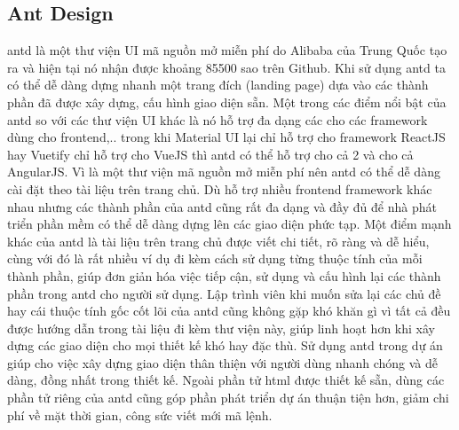 \documentclass[./../main.tex]{subfiles}
\begin{document}
\subsection{Ant Design}
\acrfull{antd} \cite{antdesign} là một thư viện UI mã nguồn mở miễn phí do Alibaba của Trung Quốc tạo ra và hiện tại nó nhận được khoảng 85500 sao trên Github. Khi sử dụng \acrshort{antd} ta có thể dễ dàng dựng nhanh một trang đích (landing page) dựa vào các thành phần đã được xây dựng, cấu hình giao diện sẵn. Một trong các điểm nổi bật của \acrshort{antd} so với các thư viện UI khác là nó hỗ trợ đa dạng các cho các framework dùng cho frontend,.. trong khi Material UI lại chỉ hỗ trợ cho framework ReactJS hay Vuetify chỉ hỗ trợ cho VueJS thì \acrshort{antd} có thể hỗ trợ cho cả 2 và cho cả AngularJS. Vì là một thư viện mã nguồn mở miễn phí nên \acrshort{antd} có thể dễ dàng cài đặt theo tài liệu trên trang chủ. Dù hỗ trợ nhiều frontend framework khác nhau nhưng các thành phần của \acrshort{antd} cũng rất đa dạng và đầy đủ để nhà phát triển phần mềm có thể dễ dàng dựng lên các giao diện phức tạp. Một điểm mạnh khác của \acrshort{antd} là tài liệu trên trang chủ được viết chi tiết, rõ ràng và dễ hiểu, cùng với đó là rất nhiều ví dụ đi kèm cách sử dụng từng thuộc tính của mỗi thành phần, giúp đơn giản hóa việc tiếp cận, sử dụng và cấu hình lại các thành phần trong \acrshort{antd} cho người sử dụng. Lập trình viên khi muốn sửa lại các chủ đề hay cái thuộc tính gốc cốt lõi của \acrshort{antd} cũng không gặp khó khăn gì vì tất cả đều được hướng dẫn trong tài liệu đi kèm thư viện này, giúp linh hoạt hơn khi xây dựng các giao diện cho mọi thiết kế khó hay đặc thù. Sử dụng \acrshort{antd} trong dự án giúp cho việc xây dựng giao diện thân thiện với người dùng nhanh chóng và dễ dàng, đồng nhất trong thiết kế. Ngoài phần tử \acrshort{html} được thiết kế sẵn, dùng các phần tử riêng của \acrshort{antd} cũng góp phần phát triển dự án thuận tiện hơn, giảm chi phí về mặt thời gian, công sức viết mới mã lệnh.
\end{document}
